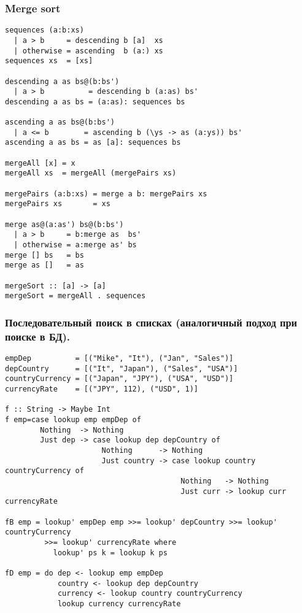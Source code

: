 \documentclass[a4paper,10pt]{article}
\begin{document}
\lstset{language=Haskell} 
\setcounter{secnumdepth}{0}
\subsubsection{Merge sort}
\begin{lstlisting}
sequences (a:b:xs)
  | a > b     = descending b [a]  xs
  | otherwise = ascending  b (a:) xs
sequences xs  = [xs]

descending a as bs@(b:bs')
  | a > b          = descending b (a:as) bs'
descending a as bs = (a:as): sequences bs

ascending a as bs@(b:bs')
  | a <= b        = ascending b (\ys -> as (a:ys)) bs'
ascending a as bs = as [a]: sequences bs

mergeAll [x] = x
mergeAll xs  = mergeAll (mergePairs xs)

mergePairs (a:b:xs) = merge a b: mergePairs xs
mergePairs xs       = xs

merge as@(a:as') bs@(b:bs')
  | a > b     = b:merge as  bs'
  | otherwise = a:merge as' bs
merge [] bs   = bs
merge as []   = as

mergeSort :: [a] -> [a]
mergeSort = mergeAll . sequences

\end{lstlisting}

\subsubsection{Последовательный поиск в списках (аналогичный подход при поиске в БД).}
\begin{lstlisting}
empDep          = [("Mike", "It"), ("Jan", "Sales")]
depCountry      = [("It", "Japan"), ("Sales", "USA")]
countryCurrency = [("Japan", "JPY"), ("USA", "USD")]
currencyRate    = [("JPY", 112), ("USD", 1)]

f :: String -> Maybe Int
f emp=case lookup emp empDep of
        Nothing  -> Nothing
        Just dep -> case lookup dep depCountry of
                      Nothing      -> Nothing
                      Just country -> case lookup country countryCurrency of
                                        Nothing   -> Nothing
                                        Just curr -> lookup curr currencyRate

fB emp = lookup' empDep emp >>= lookup' depCountry >>= lookup' countryCurrency
         >>= lookup' currencyRate where
           lookup' ps k = lookup k ps

fD emp = do dep <- lookup emp empDep
            country <- lookup dep depCountry
            currency <- lookup country countryCurrency
            lookup currency currencyRate
\end{lstlisting}
\end{document}
